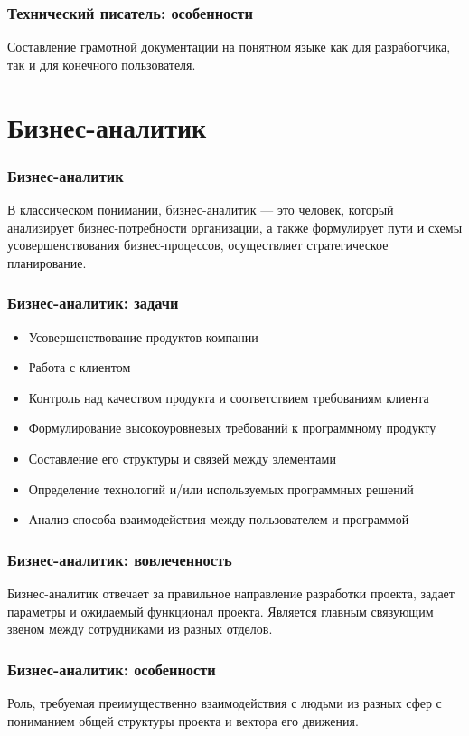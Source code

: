\documentclass{../industrial-development}
\begin{document}
	\begin{frame} \frametitle{Технический писатель: особенности}
		 Составление грамотной документации на понятном языке как для разработчика, так и для конечного пользователя.
	\end{frame}
	
	\section{Бизнес-аналитик}
	
	\begin{frame} \frametitle{Бизнес-аналитик}
		\begin{block}{}
			\alert {}В классическом понимании, {бизнес-аналитик} — это человек, который анализирует бизнес-потребности организации, а также формулирует пути и схемы усовершенствования бизнес-процессов, осуществляет стратегическое планирование. 
		\end{block}
		
	\end{frame}
	
	\begin{frame} \frametitle{Бизнес-аналитик: задачи}
		\begin{itemize}
			\item Усовершенствование продуктов компании
			\item Работа с клиентом
			\item Контроль над качеством продукта и соответствием требованиям клиента
			\item Формулирование высокоуровневых требований к программному продукту
			\item Составление его структуры и связей между элементами
			\item Определение технологий и/или используемых программных решений
			\item Анализ способа взаимодействия между пользователем и программой
		\end{itemize}
	\end{frame}
	
	\begin{frame} \frametitle{Бизнес-аналитик: вовлеченность}
		Бизнес-аналитик отвечает за правильное направление разработки проекта, задает параметры и ожидаемый функционал проекта. Является главным связующим звеном между сотрудниками из разных отделов.
	\end{frame}
	
	\begin{frame} \frametitle{Бизнес-аналитик: особенности}
		Роль, требуемая преимущественно взаимодействия с людьми из разных сфер с пониманием общей структуры проекта и вектора его движения. 
	\end{frame}
	
\end{document}

